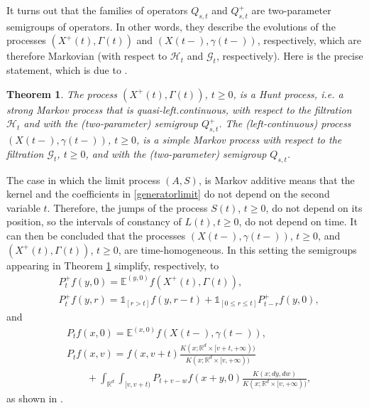 \documentclass[reqno]{amsart}
\newtheorem{theorem}{Theorem}[section] %
\theoremstyle{remark}
\numberwithin{equation}{section} %
\newcommand{\1}{\mathds{1}}
\begin{document}
	It turns out that the families of operators $Q_{s,t}$ and $Q^+_{s,t}$ are two-parameter semigroups of operators. In other words, they describe the evolutions of the processes $(X^+(t), \Gamma(t))$ and $(X(t-), \gamma(t-))$, respectively, which are therefore Markovian (with respect to $\mathcal{H}_t$ and $\mathcal{G}_t$, respectively). Here is the precise statement, which is due to \cite{Meerschaert2014}.
	\begin{theorem}
		\label{theorem_semim}
		The process $(X^+(t), \Gamma(t))$, $t \geq 0$, is a Hunt process, {i.e. a strong Markov process that is quasi-left.continuous}, with respect to the filtration $\mathcal{H}_t$ and with the (two-parameter) semigroup $Q^+_{s,t}$. The (left-continuous) process $(X(t-), \gamma(t-))$, $t \geq 0$, is a simple Markov process with respect to the filtration $\mathcal{G}_t$, $t \geq 0$, and with the (two-parameter) semigroup $Q_{s,t}$.
	\end{theorem}
	
	
	The case in which the limit process $(A,S)$, is Markov additive means that the kernel and the coefficients in \eqref{generatorlimit} do not depend on the second variable $t$. Therefore, the jumps of the process $S(t)$, $t\ge0$, do not depend on its position, so the intervals of constancy of $L(t), t \geq 0$, do not depend on time. It can  then be concluded that the processes $(X(t-), \gamma(t-))$, $t\ge0$, and $(X^+(t), \Gamma(t))$, $t\ge0$, are time-homogeneous. In this setting the semigroups appearing in Theorem \ref{theorem_semim} simplify, respectively, to
	\begin{align}
		&P^+_t f(y,0) = \mathds{E}^{(y,0)} f (X^+(t), \Gamma(t)), \\
		& P^+_tf(y,r) = \mathds{1}_{[r>t]} f(y,r-t) + \mathds{1}_{[0\leq r \leq t]} P^+_{t-r}f(y,0),
	\end{align}
	and
	\begin{align}
		&P_t f(x,0) = \mathds{E}^{(x,0)} f (X(t-), \gamma(t-)), \\
		& P_tf(x,v) =f(x,v+t) \frac{K(x; \mathbb{R}^d \times [v+t,+\infty))}{K(x; \mathbb{R}^d \times [v,+\infty))}  \\ & \qquad +  \int_{\mathbb{R}^d} \int_{[v,v+t)} P_{t+v-w} f(x+y,0)  \frac{K(x;dy,dw)}{K(x; \mathbb{R}^d \times [v,+\infty))},
	\end{align}
	as shown in \cite[Theorem 4.1]{Meerschaert2014}.
	
\end{document}
